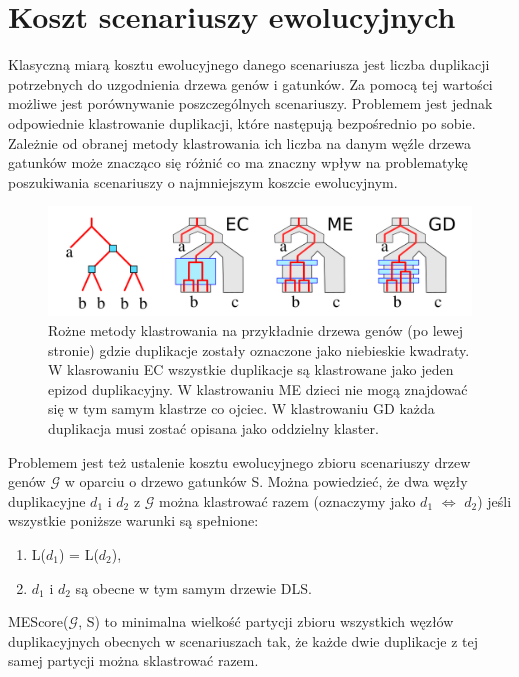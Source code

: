 \documentclass[licencjacka]{pracamgr}
\begin{document}
\section{Koszt scenariuszy ewolucyjnych}

Klasyczną miarą kosztu ewolucyjnego danego scenariusza jest liczba duplikacji potrzebnych do uzgodnienia drzewa genów i gatunków. Za pomocą tej wartości możliwe jest porównywanie poszczególnych scenariuszy.
Problemem jest jednak odpowiednie klastrowanie duplikacji, które następują bezpośrednio po sobie. Zależnie od obranej metody klastrowania ich liczba na danym węźle drzewa gatunków może znacząco się różnić co ma znaczny wpływ na problematykę poszukiwania scenariuszy o najmniejszym koszcie ewolucyjnym. 

\begin{figure}[H]
  \centering
  \includegraphics[width=140mm]{./pictures/clas_type.png}
  \caption{Rożne metody klastrowania na przykładnie drzewa genów (po lewej stronie) gdzie duplikacje zostały oznaczone jako niebieskie kwadraty. W klasrowaniu EC wszystkie duplikacje są klastrowane jako jeden epizod duplikacyjny. W klastrowaniu ME dzieci nie mogą znajdować się w tym samym klastrze co ojciec. W klastrowaniu GD każda duplikacja musi zostać opisana jako oddzielny klaster.}
\end{figure}


Problemem jest też ustalenie kosztu ewolucyjnego zbioru scenariuszy drzew genów $\mathcal{G}$ w oparciu o drzewo gatunków S. Można powiedzieć, że dwa węzły duplikacyjne \textit{$d_1$} i \textit{$d_2$} z $\mathcal{G}$ można klastrować razem (oznaczymy jako \textit{$d_1$} $\Longleftrightarrow$ \textit{$d_2$})  jeśli wszystkie poniższe warunki są spełnione:
\begin{enumerate}
\item L($d_1$) = L(\textit{$d_2$}),
\item \textit{$d_1$} i \textit{$d_2$} są obecne w tym samym drzewie DLS.
\end{enumerate}

MEScore($\mathcal{G}$, S) to minimalna wielkość partycji zbioru wszystkich węzłów duplikacyjnych obecnych w scenariuszach tak, że każde dwie duplikacje z tej samej partycji można sklastrować razem.
\end{document}
